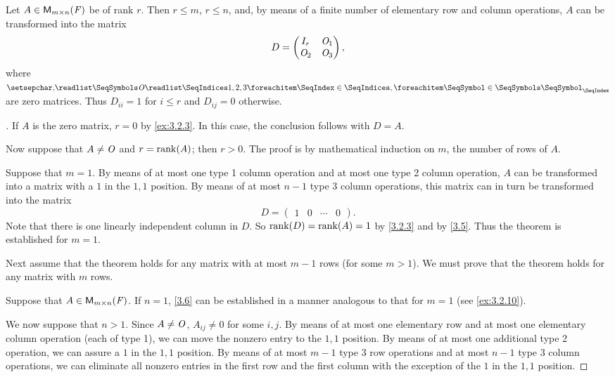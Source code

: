 \begin{thm}\label{3.6}
	Let \(A \in \ms\) be of rank \(r\).
	Then \(r \leq m\), \(r \leq n\), and, by means of a finite number of elementary row and column operations, \(A\) can be transformed into the matrix
	\[
		D = \begin{pmatrix}
			I_r   & \mathit{O}_1 \\
			\mathit{O}_2 & \mathit{O}_3
		\end{pmatrix},
	\]
	where \(\seq{\zm}{1,2,3}\) are zero matrices.
	Thus \(D_{i i} = 1\) for \(i \leq r\) and \(D_{i j} = 0\) otherwise.
\end{thm}

\begin{proof}[]
	If \(A\) is the zero matrix, \(r = 0\) by \cref{ex:3.2.3}.
	In this case, the conclusion follows with \(D = A\).

	Now suppose that \(A \neq \mathit{O}\) and \(r = \rk{A}\);
	then \(r > 0\).
	The proof is by mathematical induction on \(m\), the number of rows of \(A\).

	Suppose that \(m = 1\).
	By means of at most one type 1 column operation and at most one type 2 column operation, \(A\) can be transformed into a matrix with a \(1\) in the \(1,1\) position.
	By means of at most \(n - 1\) type 3 column operations, this matrix can in turn be transformed into the matrix
	\[
		D = \begin{pmatrix}
			1 & 0 & \cdots & 0
		\end{pmatrix}.
	\]
	Note that there is one linearly independent column in \(D\).
	So \(\rk{D} = \rk{A} = 1\) by \cref{3.2.3} and by \cref{3.5}.
	Thus the theorem is established for \(m = 1\).

	Next assume that the theorem holds for any matrix with at most \(m - 1\) rows (for some \(m > 1\)).
	We must prove that the theorem holds for any matrix with \(m\) rows.

	Suppose that \(A \in \ms\).
	If \(n = 1\), \cref{3.6} can be established in a manner analogous to that for \(m = 1\)
	(see \cref{ex:3.2.10}).

	We now suppose that \(n > 1\).
	Since \(A \neq \mathit{O}\), \(A_{i j} \neq 0\) for some \(i, j\).
	By means of at most one elementary row and at most one elementary column operation (each of type 1), we can move the nonzero entry to the \(1,1\) position.
	By means of at most one additional type 2 operation, we can assure a \(1\) in the \(1,1\) position.
	By means of at most \(m - 1\) type 3 row operations and at most \(n - 1\) type 3 column operations, we can eliminate all nonzero entries in the first row and the first column with the exception of the \(1\) in the \(1,1\) position.


\end{proof}
